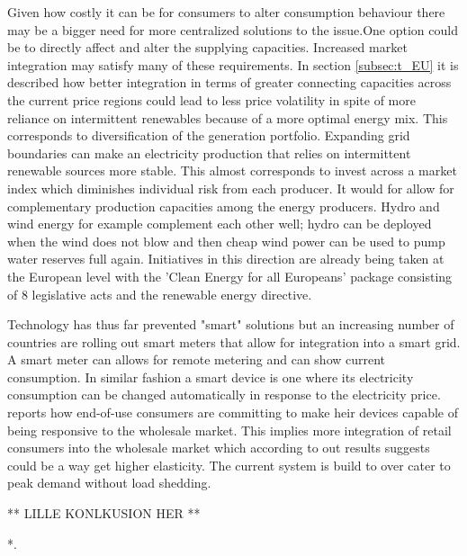 Given how costly it can be for consumers to alter consumption behaviour there may be a bigger need for more centralized solutions to the issue.One option could be to directly affect and alter the supplying capacities.
Increased market integration may satisfy many of these requirements. In section \ref{subsec:t_EU} it is described how better integration in terms of greater connecting capacities across the current price regions could lead to less price volatility in spite of more reliance on intermittent renewables because of a more optimal energy mix. This corresponds to diversification of the generation portfolio. Expanding grid boundaries can make an electricity production that relies on intermittent renewable sources more stable. This almost corresponds to invest across a market index which diminishes individual risk from each producer. It would for allow for complementary production capacities among the energy producers. Hydro and wind energy for example complement each other well;  hydro can be deployed when the wind does not blow and then cheap wind power can be used to pump water reserves full again. Initiatives in this direction are already being taken at the European level with the 'Clean Energy for all Europeans' package consisting of 8 legislative acts and the renewable energy directive.

Technology has thus far prevented "smart" solutions but an increasing number of countries are rolling out smart meters that allow for integration into a smart grid. A smart meter can allows for remote metering and can show current consumption. In similar fashion a smart device is one where its electricity consumption can be changed automatically in response to the electricity price.
\cite{biggar2014economics} reports how end-of-use consumers are committing to make heir devices capable of being responsive to the wholesale market. This implies more integration of retail consumers into the wholesale market which according to out results suggests could be a way get higher elasticity. The current system is build to over cater to peak demand without load shedding. 

** LILLE KONLKUSION HER ** 


*. %


